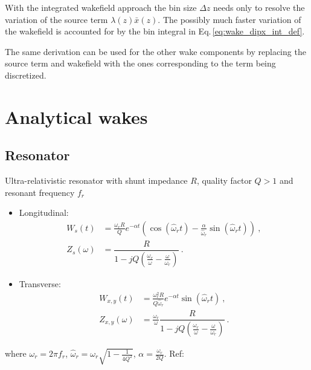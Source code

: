 With the integrated wakefield approach the bin size $\Delta z$ needs only to
resolve the variation of the source term $\lambda(z)\bar{x}(z)$. The possibly
much faster variation of the wakefield is accounted for by the bin integral in
Eq.\,\eqref{eq:wake_dipx_int_def}.

The same derivation can be used for the other wake components by replacing the
source term and wakefield with the ones corresponding to the term being
discretized.

\section{Analytical wakes}
\subsection*{Resonator}
Ultra-relativistic resonator with shunt impedance $R$, quality factor $Q>1$ and resonant frequency $f_r$
\begin{itemize}
    \item Longitudinal:
    \begin{align}
        W_{s}(t) &= \frac{\omega_r R}{Q} e^{-\alpha t} \left(
                   \cos(\widehat{\omega}_r t) -
                   \frac{\alpha}{\widehat{\omega}_r} \sin(\widehat{\omega}_r t)\right)~,\\
        Z_{s}(\omega) &= \dfrac{R}{1 - jQ\left(\frac{\omega_r}{\omega} - \frac{\omega}{\omega_r}\right)}~.
    \end{align}
    \item Transverse:
    \begin{align}
        W_{x,y}(t) &= \frac{\omega_r^2 R }{Q \widehat{\omega}_r} e^{-\alpha t}\sin(\widehat{\omega}_r t)~,\\
        Z_{x,y}(\omega) &= \frac{\omega_r}{\omega} \dfrac{R}{1 - jQ\left(\frac{\omega_r}{\omega} - \frac{\omega}{\omega_r}\right)}~.
    \end{align}
\end{itemize}
where $\omega_r = 2\pi f_r$, $\widehat{\omega}_r = \omega_r \sqrt{1-\frac{1}{4Q^2}}$, $\alpha=\frac{\omega_r}{2Q}$. Ref: \cite[Section 2.2]{Mounet:Thesis}

